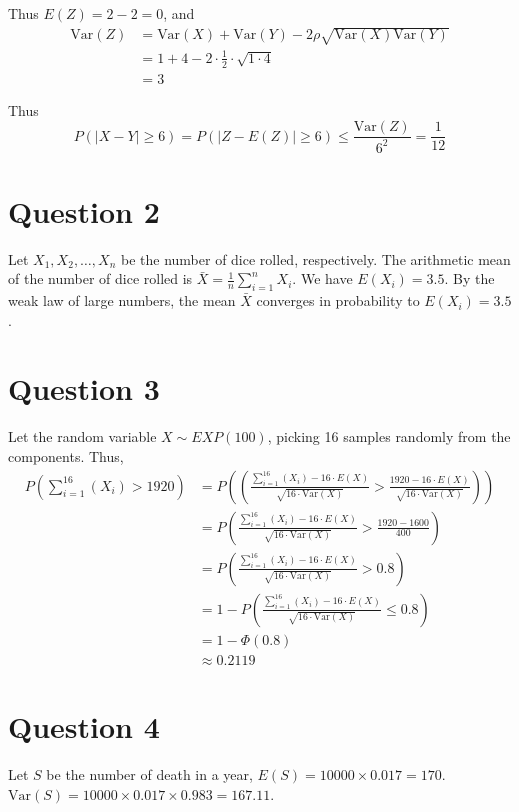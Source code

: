 \documentclass[a4paper, UTF-8]{article}
\theoremstyle{plain}
\begin{document}
Thus $E(Z) = 2 - 2 = 0$, and
\begin{align*}
\text{Var}(Z) & = \text{Var}(X) + \text{Var}(Y) - 2\rho \sqrt{\text{Var}(X)\text{Var}(Y)} \\
& = 1 + 4 - 2\cdot\frac{1}{2}\cdot \sqrt{1 \cdot 4} \\ 
& = 3
\end{align*}

Thus 
$$
P(|X - Y| \geq 6) = P(|Z - E(Z)| \geq 6) \leq \frac{\text{Var}(Z)}{6^2} = \frac{1}{12}
$$

\section{Question 2} 

Let $X_1, X_2, \ldots, X_n$ be the number of dice rolled, respectively. The arithmetic mean of the number of dice rolled is $\bar{X} = \frac{1}{n}\sum_{i=1}^{n} X_i$. We have $E(X_i) = 3.5$. By the weak law of large numbers, the mean $\bar{X}$ converges in probability to $E(X_i) = 3.5$. 

\section{Question 3} 

Let the random variable $X \sim EXP(100)$, picking 16 samples randomly from the components. Thus, 
\begin{align*}
P\left(\sum_{i=1}^{16} (X_i) > 1920\right) &= P\left(\left(\frac{\sum_{i=1}^{16} (X_i) - 16\cdot E(X)}{\sqrt{16\cdot \text{Var}(X)}} > \frac{1920 - 16\cdot E(X)}{\sqrt{16\cdot \text{Var}(X)}}\right)\right) \\
& = P\left(\frac{\sum_{i=1}^{16} (X_i) - 16\cdot E(X)}{\sqrt{16\cdot \text{Var}(X)}} > \frac{1920 - 1600}{400}\right) \\
& = P\left(\frac{\sum_{i=1}^{16} (X_i) - 16\cdot E(X)}{\sqrt{16\cdot \text{Var}(X)}} > 0.8\right) \\
& = 1 - P\left(\frac{\sum_{i=1}^{16} (X_i) - 16\cdot E(X)}{\sqrt{16\cdot \text{Var}(X)}} \leq 0.8\right) \\
& = 1 - \Phi(0.8) \\
& \approx 0.2119
\end{align*}

\section{Question 4} 

Let $S$ be the number of death in a year, $E(S) = 10000 \times 0.017 = 170$. $\text{Var}(S) = 10000 \times 0.017 \times 0.983 = 167.11$. 
\end{document}
